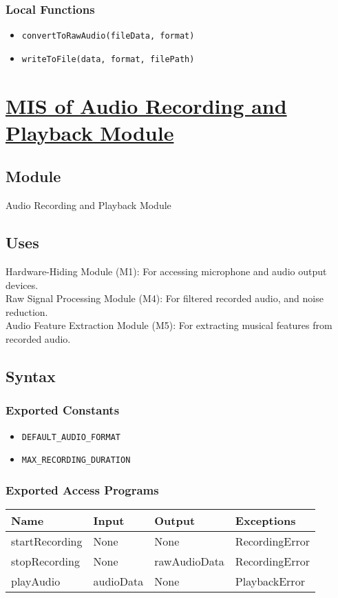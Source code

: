 \documentclass[12pt, titlepage]{article}
\begin{document}
\subsubsection{Local Functions}  
\begin{itemize}  
    \item \texttt{convertToRawAudio(fileData, format)}  
    \item \texttt{writeToFile(data, format, filePath)}  
\end{itemize}  

\section{\hyperref[mARP]{MIS of Audio Recording and Playback Module}} \label{M7}  

\subsection{Module}  
Audio Recording and Playback Module  

\subsection{Uses}  
Hardware-Hiding Module (M1): For accessing microphone and audio output devices. \\
Raw Signal Processing Module (M4): For filtered recorded audio, and noise reduction. \\
Audio Feature Extraction Module (M5): For extracting musical features from recorded audio. \\

\subsection{Syntax}  

\subsubsection{Exported Constants}  
\begin{itemize}
    \item \texttt{DEFAULT\_AUDIO\_FORMAT}  
    \item \texttt{MAX\_RECORDING\_DURATION}  
\end{itemize}  

\subsubsection{Exported Access Programs}  
\begin{center}  
\begin{tabular}{|p{3cm}|p{4cm}|p{4cm}|p{3.5cm}|}  
\hline  
\textbf{Name} & \textbf{Input} & \textbf{Output} & \textbf{Exceptions} \\  
\hline  
startRecording & None & None & RecordingError \\  
stopRecording & None & rawAudioData & RecordingError \\  
playAudio & audioData & None & PlaybackError \\  
\hline  
\end{tabular}  
\end{center}  
\end{document}
